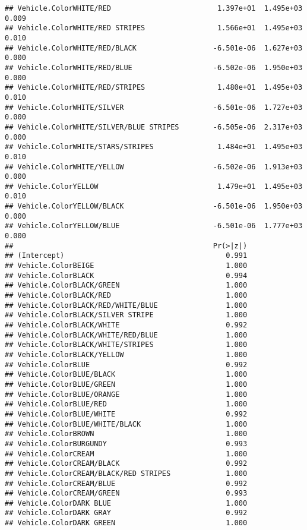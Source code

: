 \documentclass[
]{article}
\begin{document}
\begin{verbatim}
## Vehicle.ColorWHITE/RED                         1.397e+01  1.495e+03   0.009
## Vehicle.ColorWHITE/RED STRIPES                 1.566e+01  1.495e+03   0.010
## Vehicle.ColorWHITE/RED/BLACK                  -6.501e-06  1.627e+03   0.000
## Vehicle.ColorWHITE/RED/BLUE                   -6.502e-06  1.950e+03   0.000
## Vehicle.ColorWHITE/RED/STRIPES                 1.480e+01  1.495e+03   0.010
## Vehicle.ColorWHITE/SILVER                     -6.501e-06  1.727e+03   0.000
## Vehicle.ColorWHITE/SILVER/BLUE STRIPES        -6.505e-06  2.317e+03   0.000
## Vehicle.ColorWHITE/STARS/STRIPES               1.484e+01  1.495e+03   0.010
## Vehicle.ColorWHITE/YELLOW                     -6.502e-06  1.913e+03   0.000
## Vehicle.ColorYELLOW                            1.479e+01  1.495e+03   0.010
## Vehicle.ColorYELLOW/BLACK                     -6.501e-06  1.950e+03   0.000
## Vehicle.ColorYELLOW/BLUE                      -6.501e-06  1.777e+03   0.000
##                                               Pr(>|z|)
## (Intercept)                                      0.991
## Vehicle.ColorBEIGE                               1.000
## Vehicle.ColorBLACK                               0.994
## Vehicle.ColorBLACK/GREEN                         1.000
## Vehicle.ColorBLACK/RED                           1.000
## Vehicle.ColorBLACK/RED/WHITE/BLUE                1.000
## Vehicle.ColorBLACK/SILVER STRIPE                 1.000
## Vehicle.ColorBLACK/WHITE                         0.992
## Vehicle.ColorBLACK/WHITE/RED/BLUE                1.000
## Vehicle.ColorBLACK/WHITE/STRIPES                 1.000
## Vehicle.ColorBLACK/YELLOW                        1.000
## Vehicle.ColorBLUE                                0.992
## Vehicle.ColorBLUE/BLACK                          1.000
## Vehicle.ColorBLUE/GREEN                          1.000
## Vehicle.ColorBLUE/ORANGE                         1.000
## Vehicle.ColorBLUE/RED                            1.000
## Vehicle.ColorBLUE/WHITE                          0.992
## Vehicle.ColorBLUE/WHITE/BLACK                    1.000
## Vehicle.ColorBROWN                               1.000
## Vehicle.ColorBURGUNDY                            0.993
## Vehicle.ColorCREAM                               1.000
## Vehicle.ColorCREAM/BLACK                         0.992
## Vehicle.ColorCREAM/BLACK/RED STRIPES             1.000
## Vehicle.ColorCREAM/BLUE                          0.992
## Vehicle.ColorCREAM/GREEN                         0.993
## Vehicle.ColorDARK BLUE                           1.000
## Vehicle.ColorDARK GRAY                           0.992
## Vehicle.ColorDARK GREEN                          1.000

\end{verbatim}
\end{document}
